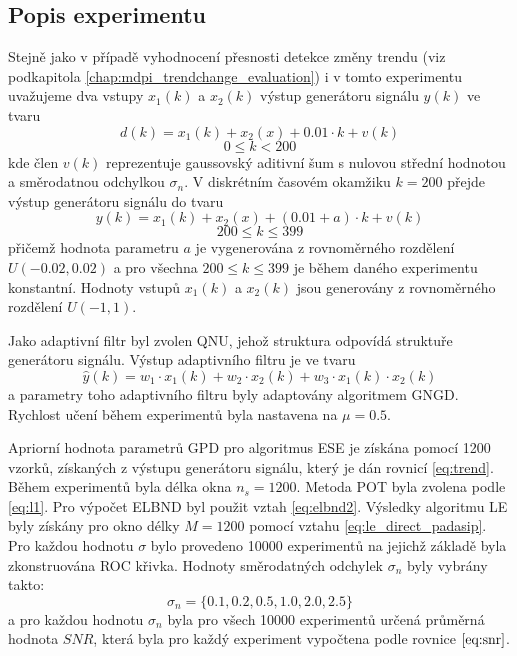 \subsection{Popis experimentu}
Stejně jako v případě vyhodnocení přesnosti detekce změny trendu (viz podkapitola \ref{chap:mdpi_trendchange_evaluation}) i v tomto experimentu uvažujeme dva vstupy $x_1(k)$ a $x_2(k)$ výstup generátoru signálu $y(k)$ ve tvaru 
\begin{equation}
    \label{eq:trend}
    d(k)=x_1(k)+x_2(x)+0.01\cdot k + v(k)
\end{equation}
\begin{equation*}
0\leq k < 200
\end{equation*}
kde člen $v(k)$ reprezentuje gaussovský aditivní šum s nulovou střední hodnotou a směrodatnou odchylkou $\sigma_n$. V diskrétním časovém okamžiku $k=200$ přejde výstup generátoru signálu do tvaru
\begin{equation}
y(k)=x_1(k)+x_2(x)+(0.01 + a)\cdot k + v(k)
\end{equation}
\begin{equation*}
200 \leq k \leq 399
\end{equation*}
přičemž hodnota parametru $a$ je vygenerována z rovnoměrného rozdělení $U(-0.02,0.02)$ a pro všechna $200 \leq k \leq 399$ je během daného experimentu konstantní. Hodnoty vstupů $x_1(k)$ a $x_2(k)$ jsou generovány z rovnoměrného rozdělení $U(-1,1)$. 
\par 
Jako adaptivní filtr byl zvolen QNU, jehož struktura odpovídá struktuře generátoru signálu. Výstup adaptivního filtru je ve tvaru
\begin{equation}
\hat{y}(k)=w_1\cdot x_1(k)+w_2\cdot x_2(k) + w_3 \cdot x_1(k) \cdot x_2(k)
\end{equation}
a parametry toho adaptivního filtru byly adaptovány algoritmem GNGD. Rychlost učení během experimentů byla nastavena na $\mu=0.5$.
\par 
Apriorní hodnota parametrů GPD pro algoritmus ESE je získána pomocí 1200 vzorků, získaných z výstupu generátoru signálu, který je dán rovnicí \ref{eq:trend}. Během experimentů byla délka okna $n_s=1200$. Metoda POT byla zvolena podle \ref{eq:l1}. Pro výpočet ELBND byl použit vztah \ref{eq:elbnd2}. Výsledky algoritmu LE byly získány pro okno délky $M=1200$ pomocí vztahu \ref{eq:le_direct_padasip}. Pro každou hodnotu $\sigma$ bylo provedeno 10000 experimentů na jejichž základě byla zkonstruována ROC křivka. Hodnoty směrodatných odchylek $\sigma_n$ byly vybrány takto:
\begin{equation}
\sigma_n=\{0.1,0.2,0.5,1.0,2.0,2.5 \}
\end{equation}
a pro každou hodnotu $\sigma_n$ byla pro všech 10000 experimentů určená průměrná hodnota $SNR$, která byla pro každý experiment vypočtena podle rovnice $\ref{eq:snr}$. 

